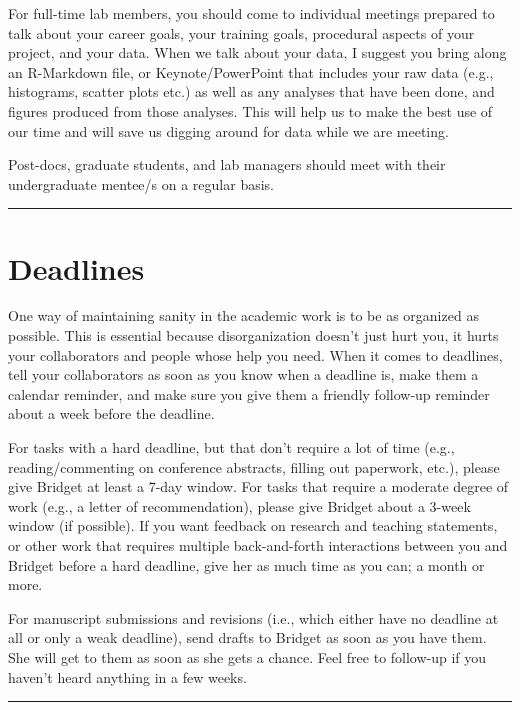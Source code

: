 \documentclass[]{book}
\begin{document}
For full-time lab members, you should come to individual meetings prepared to talk about your career goals, your training goals, procedural aspects of your project, and your data. When we talk about your data, I suggest you bring along an R-Markdown file, or Keynote/PowerPoint that includes your raw data (e.g., histograms, scatter plots etc.) as well as any analyses that have been done, and figures produced from those analyses. This will help us to make the best use of our time and will save us digging around for data while we are meeting.

Post-docs, graduate students, and lab managers should meet with their undergraduate mentee/s on a regular basis.

\begin{center}\rule{0.5\linewidth}{0.5pt}\end{center}

\hypertarget{deadlines}{%
\section{Deadlines}\label{deadlines}}

One way of maintaining sanity in the academic work is to be as organized as possible. This is essential because disorganization doesn't just hurt you, it hurts your collaborators and people whose help you need. When it comes to deadlines, tell your collaborators as soon as you know when a deadline is, make them a calendar reminder, and make sure you give them a friendly follow-up reminder about a week before the deadline.

For tasks with a hard deadline, but that don't require a lot of time (e.g., reading/commenting on conference abstracts, filling out paperwork, etc.), please give Bridget at least a 7-day window. For tasks that require a moderate degree of work (e.g., a letter of recommendation), please give Bridget about a 3-week window (if possible). If you want feedback on research and teaching statements, or other work that requires multiple back-and-forth interactions between you and Bridget before a hard deadline, give her as much time as you can; a month or more.

For manuscript submissions and revisions (i.e., which either have no deadline at all or only a weak deadline), send drafts to Bridget as soon as you have them. She will get to them as soon as she gets a chance. Feel free to follow-up if you haven't heard anything in a few weeks.

\begin{center}\rule{0.5\linewidth}{0.5pt}\end{center}
\end{document}
